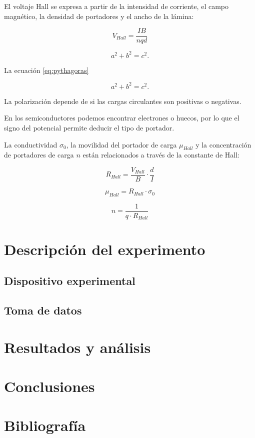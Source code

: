 \documentclass[a4paper,12pt,spanish]{report}
\begin{document}
	El voltaje Hall se expresa a partir de la intensidad de corriente, el campo magnético, la densidad de portadores y el ancho de la lámina:
	
	
	\[
	V_{Hall} = \frac{I B}{nqd}
	\]
	
	\begin{equation}\label{eq:pythagoras}
	a^2 + b^2 = c^2 .
	\end{equation}
	
	La ecuación \eqref{eq:pythagoras}
	
	\begin{equation}
	a^2 + b^2 = c^2 .
	\end{equation}
	
	
	La polarización depende de si las cargas circulantes son positivas o negativas.
	
	En los semiconductores podemos encontrar electrones o huecos, por lo que el signo del potencial permite deducir el tipo de portador. 
	
	La conductividad $\sigma_0$, la movilidad del portador de carga $\mu_{Hall}$ y la concentración de portadores de carga $n$ están relacionados a través de la constante de Hall:
	
	
	\[ 
	R_{Hall} = \frac{V_{Hall}}{B} \cdot \frac{d}{I}
	\]
	
	\[ 
	\mu_{Hall} = R_{Hall}\cdot \sigma_0
	\]
	
	\[ 
	n = \frac{1}{q\cdot R_{Hall}}
	\]
	
	
	
	\section{Descripción del experimento}
	
	\subsection{Dispositivo experimental}
	
	
	
	\subsection{Toma de datos}
	
	
	
	\section{Resultados y análisis}
	
	
	
	\section{Conclusiones}
	
	
	
	\section{Bibliografía}
	
	
	
\end{document}
